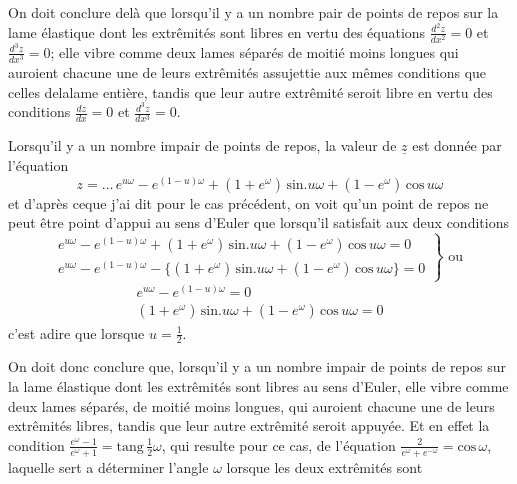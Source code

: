\documentclass[11pt,a4paper]{article}
\begin{document}

On doit conclure delà que lorsqu'il y a un nombre pair de points
de repos sur la lame élastique dont les extrêmités sont libres en
vertu des équations $\frac{d^2z}{dx^2}=0$ et $\frac{d^3z}{dx^3}=0$; elle vibre comme deux
lames séparés de moitié moins longues qui auroient chacune
une de leurs extrêmités assujettie aux mêmes conditions que celles
delalame entière, tandis que leur autre extrêmité seroit libre
en vertu des conditions $\frac{dz}{dx}=0$ et $\frac{d^3z}{dx^3}=0$.

Lorsqu'il y a un nombre impair de points de repos, la
valeur de $\underline{z}$ est donnée par l'équation
\[ z = \ldots\, e^{u\omega} - e^{(1-u)\omega} + (1+e^{\omega})\,\text{sin}.u\omega + (1-e^{\omega})\,\text{cos}\,u\omega \]
et d'après ceque j'ai dit pour le cas précédent, on voit
qu'un point de repos ne peut être point d'appui au
sens d'Euler que lorsqu'il satisfait aux deux conditions
\[ \left.\begin{array}{l} e^{u\omega} - e^{(1-u)\omega} + (1+e^{\omega})\,\text{sin}.u\omega + (1-e^{\omega})\,\text{cos}\,u\omega = 0 \\ e^{u\omega} - e^{(1-u)\omega} - \{(1+e^{\omega})\,\text{sin}.u\omega + (1-e^{\omega})\,\text{cos}\,u\omega\} = 0 \end{array}\right\} \text{ ou } \]
\[ \begin{array}{l} e^{u\omega} - e^{(1-u)\omega} = 0 \\ (1+e^{\omega})\,\text{sin}.u\omega + (1-e^{\omega})\,\text{cos}\,u\omega = 0 \end{array} \]
c'est adire que lorsque $u = \frac{1}{2}$.

On doit donc conclure que, lorsqu'il y a un nombre impair
de points de repos sur la lame élastique dont les extrêmités
sont libres au sens d'Euler, elle vibre comme deux lames
séparés, de moitié moins longues, qui auroient chacune
une de leurs extrêmités libres, tandis que leur autre extrêmité
seroit appuyée. Et en effet la condition $\frac{e^{\omega}-1}{e^{\omega}+1} = \text{tang}\,\frac{1}{2}\omega$,
qui resulte pour ce cas, de l'équation $\frac{2}{e^{\omega}+e^{-\omega}} = \text{cos}\,\omega$, laquelle
sert a déterminer l'angle $\omega$ lorsque les deux extrêmités sont
\end{document}
